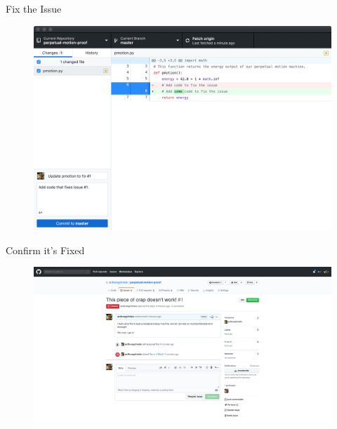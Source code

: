 \documentclass{beamer}
\begin{document}
    \begin{frame}{Fix the Issue}
        \begin{figure}
            \centering
            \includegraphics[width=\textwidth]{figures/issues_4.png}
        \end{figure}
    \end{frame}

    \begin{frame}{Confirm it's Fixed}
        \begin{figure}
            \centering
            \includegraphics[width=\textwidth]{figures/issues_5.png}
        \end{figure}
    \end{frame}
\end{document}
